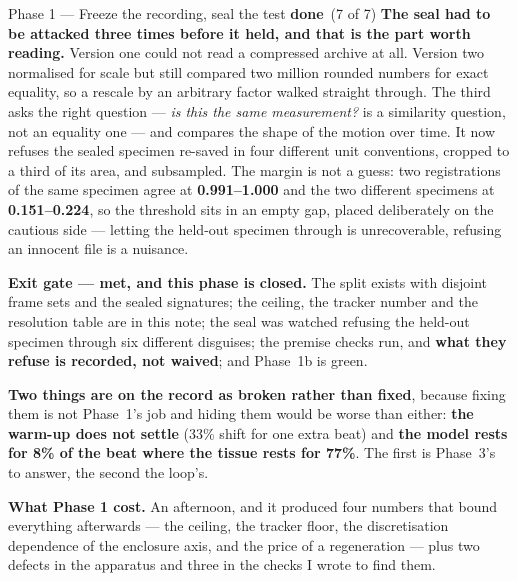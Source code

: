\documentclass[11pt,a4paper]{article}
\newcommand{\dn}{\textcolor{good}{\textbf{done}}}
\begin{document}
\begin{phasebox}{Phase 1 --- Freeze the recording, seal the test \hfill \dn\ (7 of 7)}
\textbf{The seal had to be attacked three times before it held, and that is the part worth
reading.} Version one could not read a compressed archive at all. Version two normalised for scale
but still compared two million rounded numbers for exact equality, so a rescale by an arbitrary
factor walked straight through. The third asks the right question --- \emph{is this the same
measurement?} is a similarity question, not an equality one --- and compares the shape of the
motion over time. It now refuses the sealed specimen re-saved in four different unit conventions,
cropped to a third of its area, and subsampled. The margin is not a guess: two registrations of the
same specimen agree at \textbf{0.991--1.000} and the two different specimens at
\textbf{0.151--0.224}, so the threshold sits in an empty gap, placed deliberately on the cautious
side --- letting the held-out specimen through is unrecoverable, refusing an innocent file is a
nuisance.

\textbf{Exit gate --- met, and this phase is closed.} The split exists with disjoint frame sets
and the sealed signatures; the ceiling, the tracker number and the resolution table are in this
note; the seal was watched refusing the held-out specimen through six different disguises; the
premise checks run, and \textbf{what they refuse is recorded, not waived}; and Phase~1b is green.

\textbf{Two things are on the record as broken rather than fixed}, because fixing them is not
Phase~1's job and hiding them would be worse than either: \textbf{the warm-up does not settle}
(33\% shift for one extra beat) and \textbf{the model rests for 8\% of the beat where the tissue
rests for 77\%}. The first is Phase~3's to answer, the second the loop's.

\textbf{What Phase 1 cost.} An afternoon, and it produced four numbers that bound everything
afterwards --- the ceiling, the tracker floor, the discretisation dependence of the enclosure axis,
and the price of a regeneration --- plus two defects in the apparatus and three in the checks I
wrote to find them.
\end{phasebox}
\end{document}
